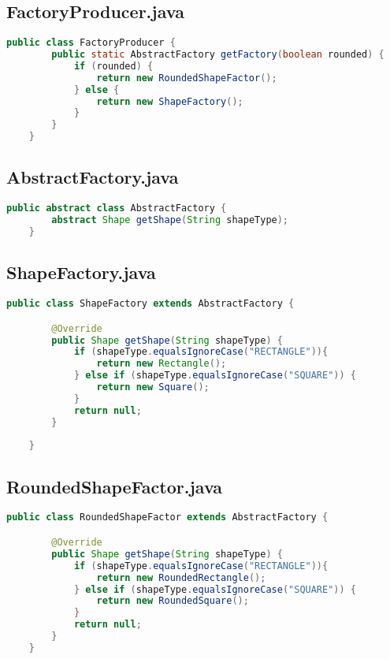     \subsection{FactoryProducer.java}
\begin{lstlisting}[language=java]
    public class FactoryProducer {
        public static AbstractFactory getFactory(boolean rounded) {
            if (rounded) {
                return new RoundedShapeFactor();
            } else {
                return new ShapeFactory();
            }
        }
    }
\end{lstlisting}

    \subsection{AbstractFactory.java}
\begin{lstlisting}[language=java]
    public abstract class AbstractFactory {
        abstract Shape getShape(String shapeType);
    }
\end{lstlisting}

    \subsection{ShapeFactory.java}
\begin{lstlisting}[language=java]
    public class ShapeFactory extends AbstractFactory {

        @Override
        public Shape getShape(String shapeType) {
            if (shapeType.equalsIgnoreCase("RECTANGLE")){
                return new Rectangle();
            } else if (shapeType.equalsIgnoreCase("SQUARE")) {
                return new Square();
            }
            return null;
        }
        
    }
\end{lstlisting}

    \subsection{RoundedShapeFactor.java}
\begin{lstlisting}[language=java]
    public class RoundedShapeFactor extends AbstractFactory {

        @Override
        public Shape getShape(String shapeType) {
            if (shapeType.equalsIgnoreCase("RECTANGLE")){
                return new RoundedRectangle();
            } else if (shapeType.equalsIgnoreCase("SQUARE")) {
                return new RoundedSquare();
            }
            return null;
        }
    }
\end{lstlisting}

